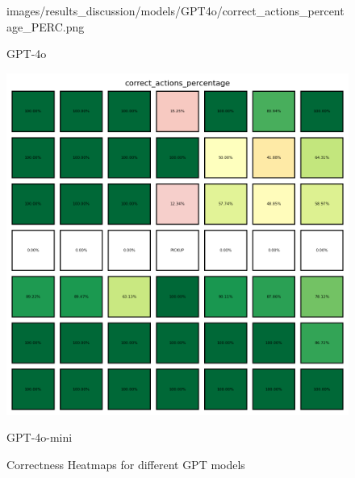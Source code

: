\begin{figure}[h]
\begin{minipage}[b]{0.32\textwidth}
{      images/results_discussion/models/GPT4o/correct_actions_percentage_PERC.png
    }
    \caption{GPT-4o}
    \label{fig:models_gpt4o}
  \end{minipage}
  \hfill
  \begin{minipage}[b]{0.32\textwidth}
    \centering
    \includegraphics[width=\textwidth]{
      images/results_discussion/models/GPT4o-mini/correct_actions_percentage_PERC.png
    }
    \caption{GPT-4o-mini}
    \label{fig:models_gpt4o_mini}
  \end{minipage}
  \caption{Correctness Heatmaps for different GPT models}
  \label{fig:models_chm}
\end{figure}